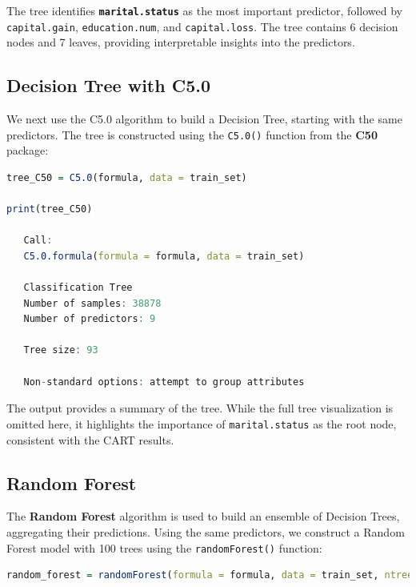 \documentclass[
]{book}
\newcommand{\passthrough}[1]{#1}
\theoremstyle{definition}
\theoremstyle{definition}
\theoremstyle{definition}
\theoremstyle{definition}
\theoremstyle{remark}
\begin{document}
The tree identifies \textbf{\passthrough{\lstinline!marital.status!}} as the most important predictor, followed by \passthrough{\lstinline!capital.gain!}, \passthrough{\lstinline!education.num!}, and \passthrough{\lstinline!capital.loss!}. The tree contains 6 decision nodes and 7 leaves, providing interpretable insights into the predictors.

\subsection*{Decision Tree with C5.0}\label{decision-tree-with-c5.0}

We next use the C5.0 algorithm to build a Decision Tree, starting with the same predictors. The tree is constructed using the \passthrough{\lstinline!C5.0()!} function from the \textbf{C50} package:

\begin{lstlisting}[language=R]
tree_C50 = C5.0(formula, data = train_set) 

print(tree_C50)
   
   Call:
   C5.0.formula(formula = formula, data = train_set)
   
   Classification Tree
   Number of samples: 38878 
   Number of predictors: 9 
   
   Tree size: 93 
   
   Non-standard options: attempt to group attributes
\end{lstlisting}

The output provides a summary of the tree. While the full tree visualization is omitted here, it highlights the importance of \passthrough{\lstinline!marital.status!} as the root node, consistent with the CART results.

\subsection*{Random Forest}\label{random-forest}

The \textbf{Random Forest} algorithm is used to build an ensemble of Decision Trees, aggregating their predictions. Using the same predictors, we construct a Random Forest model with 100 trees using the \passthrough{\lstinline!randomForest()!} function:

\begin{lstlisting}[language=R]
random_forest = randomForest(formula = formula, data = train_set, ntree = 100)
\end{lstlisting}
\end{document}
